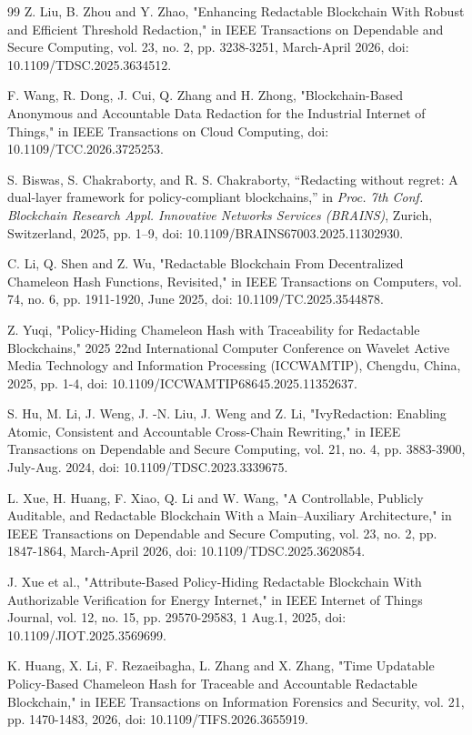 \documentclass[lettersize,journal]{IEEEtran}
\begin{document}
\begin{thebibliography}{99}
Z. Liu, B. Zhou and Y. Zhao, "Enhancing Redactable Blockchain With Robust and Efficient Threshold Redaction," in IEEE Transactions on Dependable and Secure Computing, vol. 23, no. 2, pp. 3238-3251, March-April 2026, doi: 10.1109/TDSC.2025.3634512.

F. Wang, R. Dong, J. Cui, Q. Zhang and H. Zhong, "Blockchain-Based Anonymous and Accountable Data Redaction for the Industrial Internet of Things," in IEEE Transactions on Cloud Computing, doi: 10.1109/TCC.2026.3725253.

S. Biswas, S. Chakraborty, and R. S. Chakraborty,
``Redacting without regret: A dual-layer framework for
policy-compliant blockchains,''
in \textit{Proc. 7th Conf. Blockchain Research Appl. Innovative
Networks Services (BRAINS)}, Zurich, Switzerland, 2025,
pp. 1--9, doi: 10.1109/BRAINS67003.2025.11302930.

C. Li, Q. Shen and Z. Wu, "Redactable Blockchain From Decentralized Chameleon Hash Functions, Revisited," in IEEE Transactions on Computers, vol. 74, no. 6, pp. 1911-1920, June 2025, doi: 10.1109/TC.2025.3544878.

Z. Yuqi, "Policy-Hiding Chameleon Hash with Traceability for Redactable Blockchains," 2025 22nd International Computer Conference on Wavelet Active Media Technology and Information Processing (ICCWAMTIP), Chengdu, China, 2025, pp. 1-4, doi: 10.1109/ICCWAMTIP68645.2025.11352637.

S. Hu, M. Li, J. Weng, J. -N. Liu, J. Weng and Z. Li, "IvyRedaction: Enabling Atomic, Consistent and Accountable Cross-Chain Rewriting," in IEEE Transactions on Dependable and Secure Computing, vol. 21, no. 4, pp. 3883-3900, July-Aug. 2024, doi: 10.1109/TDSC.2023.3339675.

L. Xue, H. Huang, F. Xiao, Q. Li and W. Wang, "A Controllable, Publicly Auditable, and Redactable Blockchain With a Main–Auxiliary Architecture," in IEEE Transactions on Dependable and Secure Computing, vol. 23, no. 2, pp. 1847-1864, March-April 2026, doi: 10.1109/TDSC.2025.3620854.

J. Xue et al., "Attribute-Based Policy-Hiding Redactable Blockchain With Authorizable Verification for Energy Internet," in IEEE Internet of Things Journal, vol. 12, no. 15, pp. 29570-29583, 1 Aug.1, 2025, doi: 10.1109/JIOT.2025.3569699.


K. Huang, X. Li, F. Rezaeibagha, L. Zhang and X. Zhang, "Time Updatable Policy-Based Chameleon Hash for Traceable and Accountable Redactable Blockchain," in IEEE Transactions on Information Forensics and Security, vol. 21, pp. 1470-1483, 2026, doi: 10.1109/TIFS.2026.3655919.


\end{thebibliography}
\end{document}
